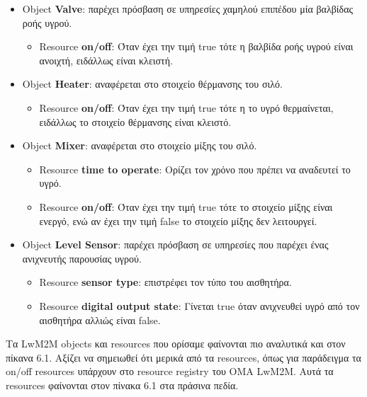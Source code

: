 \begin{itemize}
{\begin{itemize}
	\end{itemize}
	}
	\item{Object \textbf{Valve}: παρέχει πρόσβαση σε υπηρεσίες χαμηλού επιπέδου μία βαλβίδας ροής υγρού.
	\begin{itemize}
		\item{Resource \textbf{on/off}: Όταν έχει την τιμή true τότε η βαλβίδα ροής υγρού είναι ανοιχτή, ειδάλλως είναι κλειστή. }
	\end{itemize}		
	}
	\item{Object \textbf{Heater}: αναφέρεται στο στοιχείο θέρμανσης του σιλό.
		\begin{itemize}
			\item{Resource \textbf{on/off}: Όταν έχει την τιμή true τότε η το υγρό θερμαίνεται, ειδάλλως το στοιχείο θέρμανσης είναι κλειστό.}
		\end{itemize}			
	}
	\item{Object \textbf{Mixer}: αναφέρεται στο στοιχείο μίξης του σιλό.
		\begin{itemize}
			\item{Resource \textbf{time to operate}: Ορίζει τον χρόνο που πρέπει να αναδευτεί το υγρό.}
			\item{Resource \textbf{on/off}: Όταν έχει την τιμή true τότε το στοιχείο μίξης είναι ενεργό, ενώ αν έχει την τιμή false το στοιχείο μίξης δεν λειτουργεί.}
		\end{itemize}			
	}
	\item{Object \textbf{Level Sensor}: παρέχει πρόσβαση σε υπηρεσίες που παρέχει ένας ανιχνευτής παρουσίας υγρού.
		\begin{itemize}
			\item{Resource \textbf{sensor type}: επιστρέφει τον τύπο του αισθητήρα.}
			\item{Resource \textbf{digital output state}: Γίνεται true όταν ανιχνευθεί υγρό από τον αισθητήρα αλλιώς είναι false.}
		\end{itemize}		
	}
\end{itemize}

	Τα LwM2M objects και resources που ορίσαμε φαίνονται πιο αναλυτικά και στον πίκανα 6.1. Αξίζει να σημειωθεί ότι μερικά από τα resources, όπως για παράδειγμα τα on/off resources υπάρχουν στο resource registry του ΟΜΑ LwM2M. Αυτά τα resources φαίνονται στον πίνακα 6.1 στα πράσινα πεδία.

